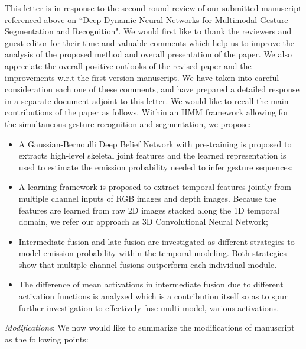 \documentclass[12pt]{article}
\begin{document}
This letter is in response to the second round review of our submitted manuscript referenced above on ``Deep Dynamic Neural Networks for Multimodal Gesture Segmentation and Recognition".
%
We would first like to thank the reviewers and guest editor for their time and valuable comments which help us to improve the analysis of the proposed method and overall presentation of the paper.
We also appreciate the overall positive outlooks of the revised paper and the improvements w.r.t the first version manuscript.
We have taken into careful consideration each one of these comments, and have prepared a detailed response
in a separate document adjoint to this letter.
%
We would like to recall the main contributions of the paper as follows.
Within an HMM framework allowing for the simultaneous gesture recognition and segmentation, we propose:
\begin{itemize}
\item A Gaussian-Bernoulli Deep Belief Network with pre-training is proposed to extracts high-level skeletal joint features and the learned representation is used to estimate the emission probability needed to infer gesture sequences;
\item A learning framework is proposed to extract temporal features jointly from multiple channel inputs of RGB images and depth images. Because the features are learned from raw 2D images stacked along the 1D temporal domain, we refer our approach as 3D Convolutional Neural Network;
\item Intermediate fusion and late fusion are investigated as different strategies to model emission probability within the temporal modeling. Both strategies show that multiple-channel fusions outperform each individual module.
\item The difference of mean activations in intermediate fusion due to different activation functions is analyzed which is a contribution itself so as to spur further investigation to effectively fuse multi-model, various activations.
\end{itemize}


{\noindent \em Modifications}: We now would like to summarize the modifications of manuscript as the following points:
\end{document}
